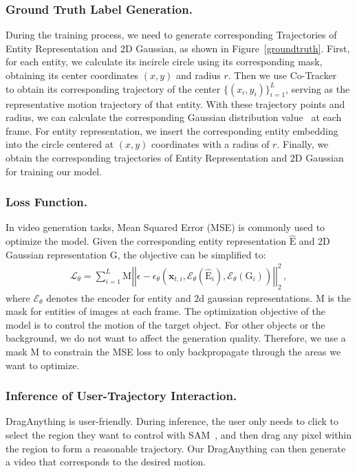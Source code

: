 \documentclass[runningheads]{llncs}
\newcommand{\encoder}{\mathcal{E}}
\newcommand{\conditioner}{\encoder_\theta}
\newcommand{\ours}{\textup{DragAnything}\xspace}
\begin{document}
\subsubsection{Ground Truth Label Generation.}
\label{groundtruth1}
During the training process, we need to generate corresponding Trajectories of Entity Representation and 2D Gaussian, as shown in Figure~\ref{groundtruth}.
%
First, for each entity, we calculate its incircle circle using its corresponding mask, obtaining its center coordinates $(x,y)$ and radius $r$.
%
Then we use Co-Tracker~\cite{karaev2023cotracker} to obtain its corresponding trajectory of the center $\{(x_i,y_i)\}_{i=1}^L$, serving as the representative motion trajectory of that entity.
%
With these trajectory points and radius, we can calculate the corresponding Gaussian distribution value~\cite{cao2017realtime} at each frame.
%
For entity representation, we insert the corresponding entity embedding into the circle centered at $(x,y)$ coordinates with a radius of $r$.
%
Finally, we obtain the corresponding trajectories of Entity Representation and 2D Gaussian for training our model.

\subsubsection{Loss Function.} In video generation tasks, Mean Squared Error (MSE) is commonly used to optimize the model.
%
Given the corresponding entity representation $\bm{\mathrm{\hat{E}}}$ and 2D Gaussian representation $\bm{\mathrm{G}}$, the objective can be simplified to:
\begin{align}
    \mathcal{L}_\theta=\sum_{i=1}^{L} \bm{\mathrm{M}}\left|\left|\epsilon-\epsilon_\theta\left(\bm{x}_{t,i},\conditioner(\bm{\mathrm{\hat{E}}}_i),\conditioner(\bm{\mathrm{G}}_i)\right)\right|\right|_2^2\, ,
\end{align}
%
where $\conditioner$ denotes the encoder for entity and 2d gaussian representations.
%
$\bm{\mathrm{M}}$ is the mask for entities of images at each frame.
%
The optimization objective of the model is to control the motion of the target object.
%
For other objects or the background, we do not want to affect the generation quality.
%
Therefore, we use a mask $\bm{\mathrm{M}}$ to constrain the MSE loss to only backpropagate through the areas we want to optimize.


\subsubsection{Inference of User-Trajectory Interaction.}
\ours is user-friendly.
%
During inference, the user only needs to click to select the region they want to control with SAM~\cite{kirillov2023segment},
%
and then drag any pixel within the region to form a reasonable trajectory.
%
Our \ours can then generate a video that corresponds to the desired motion.
\end{document}

